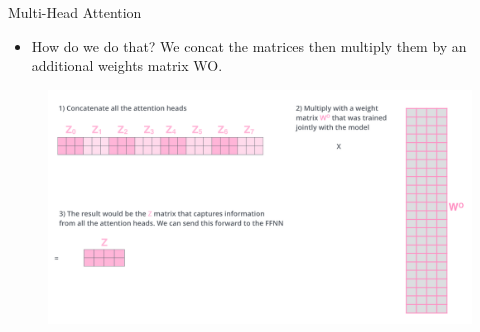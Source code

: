 \documentclass[handout]{beamer}
\begin{document}
\begin{frame}{Multi-Head Attention}

\begin{scriptsize}
\begin{itemize}
 \item How do we do that? We concat the matrices then multiply them by an additional weights matrix WO.


\end{itemize}

\end{scriptsize}


     \begin{figure}[h]
        	\includegraphics[scale = 0.22]{pics/transformer_attention_heads_weight_matrix_o.png}
        \end{figure}




\end{frame}
\end{document}
